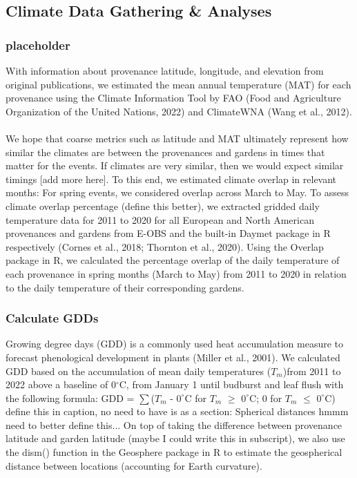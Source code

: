 \documentclass{article}
\begin{document}
\subsection{Climate Data Gathering \& Analyses}
\subsubsection {placeholder}
With information about provenance latitude, longitude, and elevation from original publications, we estimated the mean annual temperature (MAT) for each provenance using the Climate Information Tool by FAO (Food and Agriculture Organization of the United Nations, 2022) and ClimateWNA (Wang et al., 2012). 
\\
\\
We hope that coarse metrics such as latitude and MAT ultimately represent how similar the climates are between the provenances and gardens in times that matter for the events. If climates are very similar, then we would expect similar timings [add more here].
To this end, we estimated climate overlap in relevant months: For spring events, we considered overlap across March to May. To assess climate overlap percentage (define this better), we extracted gridded daily temperature data for 2011 to 2020 for all European and North American provenances and gardens from E-OBS and the built-in Daymet package in R respectively (Cornes et al., 2018; Thornton et al., 2020). Using the Overlap package in R, we calculated the percentage overlap of the daily temperature of each provenance in spring months (March to May) from 2011 to 2020 in relation to the daily temperature of their corresponding gardens. 

\subsubsection{Calculate GDDs}

Growing degree days (GDD) is a commonly used heat accumulation measure to forecast phenological development in plants (Miller et al., 2001). We calculated GDD based on the accumulation of mean daily temperatures ($T_{m}$)from 2011 to 2022 above a baseline of 0$^{\circ}$C, from January 1 until budburst and leaf flush with the following formula: GDD = $\sum$($T_{m}$ - $0^{\circ}$C for $T_{m}$ $\ge$ $0^{\circ}$C; 0 for $T_{m}$ $\le$ $0^{\circ}$C) 
\\



define this in caption, no need to have is as a section: Spherical distances 
hmmm need to better define this... 
On top of taking the difference between provenance latitude and garden latitude (maybe I could write this in subscript), we also use the dism() function in the Geosphere package in R to estimate the geospherical distance between locations (accounting for Earth curvature).
\end{document}
